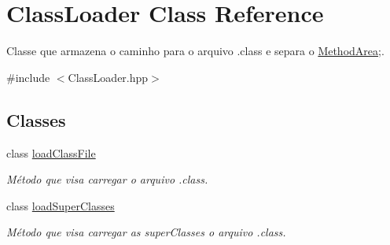 \hypertarget{classClassLoader}{}\section{Class\+Loader Class Reference}
\label{classClassLoader}


Classe que armazena o caminho para o arquivo .class e separa o \hyperlink{classMethodArea}{Method\+Area};.  




{\ttfamily \#include $<$Class\+Loader.\+hpp$>$}

\subsection*{Classes}
\begin{DoxyCompactItemize}
\item 
class \hyperlink{classClassLoader_1_1loadClassFile}{load\+Class\+File}
\begin{DoxyCompactList}\small\item\em Método que visa carregar o arquivo .class. \end{DoxyCompactList}\item 
class \hyperlink{classClassLoader_1_1loadSuperClasses}{load\+Super\+Classes}
\begin{DoxyCompactList}\small\item\em Método que visa carregar as super\+Classes o arquivo .class. \end{DoxyCompactList}\end{DoxyCompactItemize}
